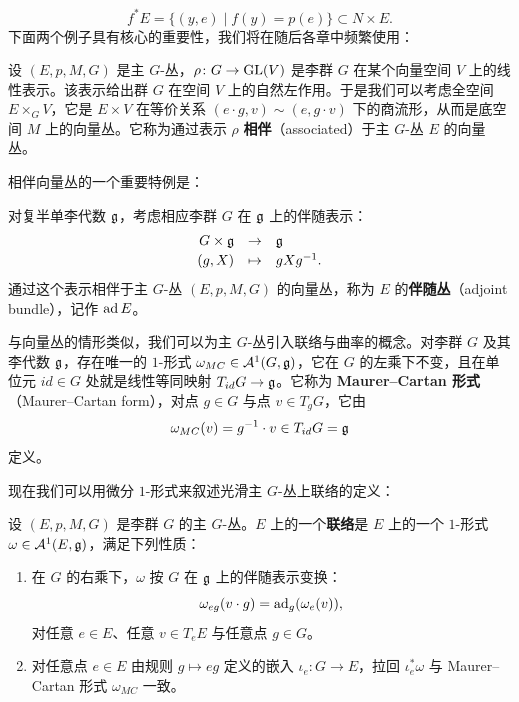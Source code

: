 \[
f^\ast E=\{(y,e)\mid f(y)=p(e)\}\subset N\times E .
\]
下面两个例子具有核心的重要性，我们将在随后各章中频繁使用：

\begin{example}[3.34]
设 $(E,p,M,G)$ 是主 $G$-丛，$\rho\colon G\to\operatorname{GL}(V)$ 是李群 $G$ 在某个向量空间 $V$ 上的线性表示。该表示给出群 $G$ 在空间 $V$ 上的自然左作用。于是我们可以考虑全空间 $E\times_G V$，它是 $E\times V$ 在等价关系 $(e\cdot g,v)\sim(e,g\cdot v)$ 下的商流形，从而是底空间 $M$ 上的向量丛。它称为通过表示 $\rho$ \textbf{相伴}（associated）于主 $G$-丛 $E$ 的向量丛。
\end{example}

相伴向量丛的一个重要特例是：

\begin{example}[3.35]
对复半单李代数 $\mathfrak{g}$，考虑相应李群 $G$ 在 $\mathfrak{g}$ 上的伴随表示：
\[
\begin{array}{rcl}
G\times\mathfrak{g} & \to & \mathfrak{g}\\[2pt]
(g,X) & \mapsto & gXg^{-1} .
\end{array}
\]
通过这个表示相伴于主 $G$-丛 $(E,p,M,G)$ 的向量丛，称为 $E$ 的\textbf{伴随丛}（adjoint bundle），记作 $\operatorname{ad}E$。
\end{example}

与向量丛的情形类似，我们可以为主 $G$-丛引入联络与曲率的概念。对李群 $G$ 及其李代数 $\mathfrak{g}$，存在唯一的 $1$-形式 $\omega_{MC}\in\mathcal{A}^1(G,\mathfrak{g})$，它在 $G$ 的左乘下不变，且在单位元 $id\in G$ 处就是线性等同映射 $T_{id}G\to\mathfrak{g}$。它称为 \textbf{Maurer–Cartan 形式}（Maurer–Cartan form），对点 $g\in G$ 与点 $v\in T_gG$，它由
\[
\omega_{MC}(v)=g^{-1}\cdot v\in T_{id}G=\mathfrak{g}
\]
定义。

现在我们可以用微分 $1$-形式来叙述光滑主 $G$-丛上联络的定义：

\begin{definition}[3.36]
设 $(E,p,M,G)$ 是李群 $G$ 的主 $G$-丛。$E$ 上的一个\textbf{联络}是 $E$ 上的一个 $1$-形式 $\omega\in\mathcal{A}^1(E,\mathfrak{g})$，满足下列性质：
\begin{enumerate}[label=\arabic*.]
\item 在 $G$ 的右乘下，$\omega$ 按 $G$ 在 $\mathfrak{g}$ 上的伴随表示变换：
\[
\omega_{eg}(v\cdot g)=\operatorname{ad}_g(\omega_e(v)) ,
\]
对任意 $e\in E$、任意 $v\in T_eE$ 与任意点 $g\in G$。
\item 对任意点 $e\in E$ 由规则 $g\mapsto eg$ 定义的嵌入 $\iota_e\colon G\to E$，拉回 $\iota_e^\ast\omega$ 与 Maurer–Cartan 形式 $\omega_{MC}$ 一致。
\end{enumerate}
\end{definition}

